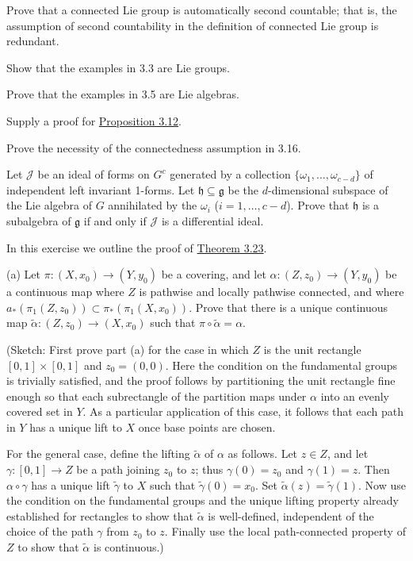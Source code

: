 \begin{problemset}

\item Prove that a connected Lie group is automatically second countable; that is, the assumption of second countability in the definition of connected Lie group is redundant.

\item Show that the examples in 3.3 are Lie groups.

\item Prove that the examples in 3.5 are Lie algebras.

\item Supply a proof for \hyperref[thm:3.12]{Proposition 3.12}.

\item Prove the necessity of the connectedness assumption in 3.16.

\item Let $\mathcal{J}$ be an ideal of forms on $G^{c}$ generated by a collection $\{\omega_{1},\ldots,\omega_{c-d}\}$ of independent left invariant 1-forms. Let $\mathfrak{h}\subseteq\mathfrak{g}$ be the $d$-dimensional subspace of the Lie algebra of $G$ annihilated by the $\omega_{i}$ ($i=1,\ldots,c-d$). Prove that $\mathfrak{h}$ is a subalgebra of $\mathfrak{g}$ if and only if $\mathcal{J}$ is a differential ideal.

\item In this exercise we outline the proof of \hyperref[thm:3.23]{Theorem 3.23}.

(a) Let $\pi\colon (X,x_0)\to(Y,y_0)$ be a covering, and let $\alpha\colon (Z,z_0)\to(Y,y_0)$ be a continuous map where $Z$ is pathwise and locally pathwise connected, and where $a_\ast(\pi_1(Z,z_0))\subset\pi_\ast(\pi_1(X,x_0))$. Prove that there is a unique continuous map $\tilde{\alpha}\colon(Z,z_0)\to(X,x_0)$ such that $\pi\circ\tilde{\alpha}=\alpha$.

(Sketch: First prove part (a) for the case in which $Z$ is the unit rectangle $[0,1] \times [0,1]$ and $z_0 = (0,0)$. Here the condition on the fundamental groups is trivially satisfied, and the proof follows by partitioning the unit rectangle fine enough so that each subrectangle of the partition maps under $\alpha$ into an evenly covered set in $Y$. As a particular application of this case, it follows that each path in $Y$ has a unique lift to $X$ once base points are chosen.

For the general case, define the lifting $\tilde{\alpha}$ of $\alpha$ as follows. Let $z \in Z$, and let $\gamma: [0,1] \to Z$ be a path joining $z_0$ to $z$; thus $\gamma(0) = z_0$ and $\gamma(1) = z$. Then $\alpha \circ \gamma$ has a unique lift $\tilde{\gamma}$ to $X$ such that $\tilde{\gamma}(0) = x_0$. Set $\tilde{\alpha}(z) = \tilde{\gamma}(1)$. Now use the condition on the fundamental groups and the unique lifting property already established for rectangles to show that $\tilde{\alpha}$ is well-defined, independent of the choice of the path $\gamma$ from $z_0$ to $z$. Finally use the local path-connected property of $Z$ to show that $\tilde{\alpha}$ is continuous.)


\end{problemset}
